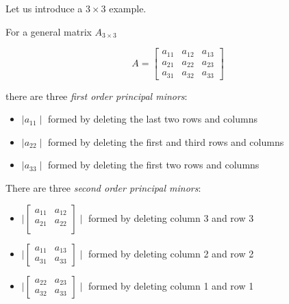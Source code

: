 \documentclass[12pt,openright,twoside,a4paper]{book}
\begin{document}
Let us introduce a $3 \times 3$ example.

For a general matrix $A_{3\times 3}$ 

\begin{equation}
A=
\begin{bmatrix}
         a_{11} & a_{12} & a_{13} \\
    	    a_{21} & a_{22} & a_{23} \\ 
	    a_{31} & a_{32} & a_{33}  
\end{bmatrix}
\end{equation}

\vspace{5mm}

there are three \textit{first order principal minors}:

\begin{itemize}
\item $\mid a_{11}\mid$ formed by deleting the last two rows and columns
\item $\mid a_{22}\mid$ formed by deleting the first and third rows and columns
\item $\mid a_{33}\mid$ formed by deleting the first two rows and columns

\end{itemize}

There are three \textit{second order principal minors}:

\begin{itemize}
\item 
$\mid\begin{bmatrix}
         a_{11} & a_{12}  \\
    	    a_{21} & a_{22}  \\ 
\end{bmatrix}\mid$ formed by deleting column 3 and row 3

\item
$\mid\begin{bmatrix}
         a_{11}  & a_{13} \\
	    a_{31}  & a_{33}  
\end{bmatrix}\mid$ formed by deleting column 2 and row 2

\item
$\mid\begin{bmatrix}
         a_{22} & a_{23} \\ 
	     a_{32} & a_{33}  
\end{bmatrix}\mid$ formed by deleting column 1 and row 1

\end{itemize}
\end{document}
